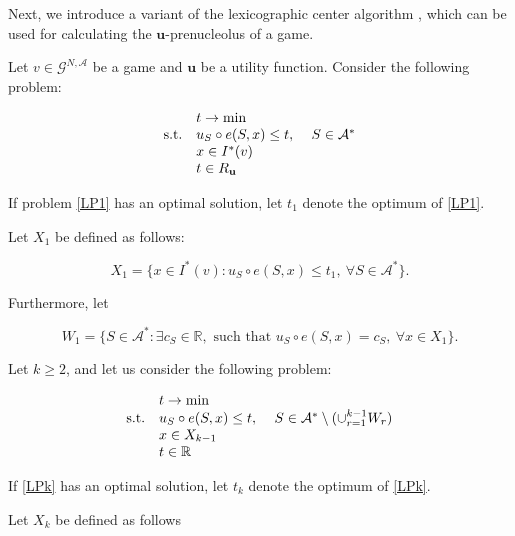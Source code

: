 \documentclass[a4paper,12pt]{article}
\theoremstyle{definition}
\theoremstyle{remark}
\begin{document}
Next, we introduce a variant of the lexicographic center algorithm \citep{Kopelowitz1967,MaschlerPelegShapley1979}, which can be used for calculating the $\mathbf{u}$-prenucleolus of a game. 

Let $v \in \mathcal{G}^{N,\mathcal{A}}$ be a game and $\mathbf{u}$ be a utility function. Consider the following problem:

\begin{equation}\label{LP1}
\begin{array}{llr}
& t \to \min & \\
\textup{s.t.} & u_S \circ e(S, x) \leq t, & \ S \in \mathcal{A}^\ast \\
& x \in I^\ast (v) &  \\
& t \in R_{\mathbf{u}} & 
\end{array}
\end{equation}

If problem \eqref{LP1} has an optimal solution, let $t_1$ denote the optimum of \eqref{LP1}.

Let $X_1$ be defined as follows:

\begin{equation*}
X_1 = \{ x \in I^\ast (v) \colon u_S \circ e(S,x) \leq t_1, \  \forall S \in \mathcal{A}^\ast \} .
\end{equation*}

\noindent Furthermore, let

\begin{equation*}
W_1 = \{ S \in \mathcal{A}^\ast \colon \exists c_S \in \mathbb{R}, \text{ such that } u_S \circ e(S,x) = c_S,\ \forall x \in X_1 \} .
\end{equation*}

Let $k \geq 2$, and let us consider the following problem:

\begin{equation}\label{LPk}
\begin{array}{lll}
& t \to \min & \\
\textup{s.t.} & u_S \circ e(S,x) \leq t , & \ S \in \mathcal{A}^\ast \setminus (\cup_{r=1}^{k-1} W_r) \\
& x \in X_{k-1} &  \\
& t \in \mathbb{R} & 
\end{array}
\end{equation}

If \eqref{LPk} has an optimal solution, let $t_k$ denote the optimum of \eqref{LPk}. 

Let $X_k$ be defined as follows
\end{document}
